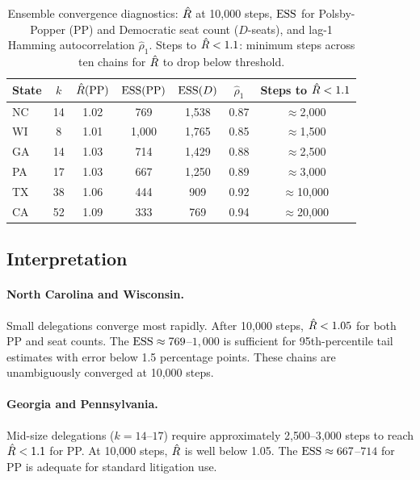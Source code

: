 \begin{table}[h]
\centering
\caption{Ensemble convergence diagnostics: $\hat{R}$ at 10{,}000 steps,
         $\mathrm{ESS}$ for Polsby-Popper (PP) and Democratic seat count ($D$-seats),
         and lag-1 Hamming autocorrelation $\hat{\rho}_1$.
         Steps to $\hat{R} < 1.1$: minimum steps across ten chains for
         $\hat{R}$ to drop below threshold.}
\label{tab:diagnostics}
\begin{tabular}{lcccccc}
\toprule
State & $k$ & $\hat{R}(\mathrm{PP})$ & $\mathrm{ESS}(\mathrm{PP})$ & $\mathrm{ESS}(D)$ & $\hat{\rho}_1$ & Steps to $\hat{R}<1.1$ \\
\midrule
NC & 14 & 1.02 & 769  & 1{,}538 & 0.87 & $\approx$2{,}000 \\
WI &  8 & 1.01 & 1{,}000 & 1{,}765 & 0.85 & $\approx$1{,}500 \\
GA & 14 & 1.03 & 714  & 1{,}429 & 0.88 & $\approx$2{,}500 \\
PA & 17 & 1.03 & 667  & 1{,}250 & 0.89 & $\approx$3{,}000 \\
TX & 38 & 1.06 & 444  &   909   & 0.92 & $\approx$10{,}000 \\
CA & 52 & 1.09 & 333  &   769   & 0.94 & $\approx$20{,}000 \\
\bottomrule
\end{tabular}
\end{table}

\subsection{Interpretation}

\paragraph{North Carolina and Wisconsin.}
Small delegations converge most rapidly.
After 10{,}000 steps, $\hat{R} < 1.05$ for both PP and seat counts.
The $\mathrm{ESS} \approx 769$--$1{,}000$ is sufficient for 95th-percentile
tail estimates with error below 1.5 percentage points.
These chains are unambiguously converged at 10{,}000 steps.

\paragraph{Georgia and Pennsylvania.}
Mid-size delegations ($k = 14$--$17$) require approximately 2{,}500--3{,}000
steps to reach $\hat{R} < 1.1$ for PP.
At 10{,}000 steps, $\hat{R}$ is well below 1.05.
The $\mathrm{ESS} \approx 667$--$714$ for PP is adequate for standard litigation use.


